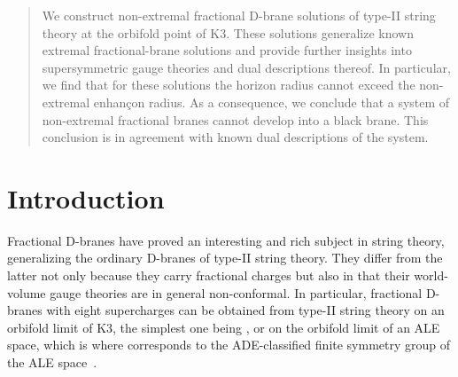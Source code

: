 \documentclass[a4paper,11pt]{article}
\providecommand{\ZZ}{\mathbb{Z}}  \providecommand{\Zint}{\mathbb{Z}}
\begin{document}
\begin{titlepage}
\begin{center}
\end{center}

\vspace{1ex}

\begin{abstract}
We construct non-extremal fractional D-brane solutions of type-II
string theory at the \myHighlight{$\ZZ_2$}\coordHE{} orbifold point of K3. These solutions
generalize known extremal fractional-brane solutions and provide
further insights into \coordHE{} supersymmetric gauge theories
and dual descriptions thereof. In particular, we find that for these
solutions the horizon radius cannot exceed the non-extremal
enhan\c{c}on radius. As a consequence, we conclude that a system of
non-extremal fractional branes cannot develop into a black brane. This
conclusion is in agreement with known dual descriptions of the system.
\end{abstract}

\vspace*{3ex}

\end{titlepage}

\renewcommand{\thefootnote}{\arabic{footnote}}
\setcounter{footnote}{0} \setcounter{page}{2} \setcounter{tocdepth}{2}



\tableofcontents


\vspace{1ex}
\section{Introduction}

Fractional D-branes
\cite{Douglas:1997xg,Douglas:1997de,Polchinski:1997ry} have proved an
interesting and rich subject in string theory, generalizing the ordinary
D-branes of type-II string theory. They differ from the latter not only
because they carry fractional charges but also in that their world-volume
gauge theories are in general non-conformal. In particular, fractional
D-branes with eight supercharges can be obtained from type-II string
theory on an orbifold limit of K3, the simplest one being \myHighlight{$T^4\!/\ZZ_2$}\coordHE{},
or on the orbifold limit of an ALE space, which is \coordHE{} where
\myHighlight{$\Gamma$}\coordHE{} corresponds to the ADE-classified finite symmetry group of the
ALE space~\cite{Douglas:1996sw,Johnson:1997py}.
\end{document}
